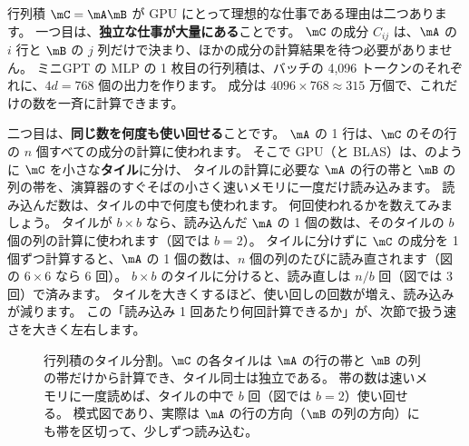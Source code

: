 行列積 $\mC=\mA\mB$ が GPU にとって理想的な仕事である理由は二つあります。
一つ目は、\textbf{独立な仕事が大量にある}ことです。
$\mC$ の成分 $C_{ij}$ は、$\mA$ の $i$ 行と $\mB$ の $j$ 列だけで決まり、ほかの成分の計算結果を待つ必要がありません。
ミニGPT の MLP の 1 枚目の行列積は、バッチの 4,096 トークンのそれぞれに、$4d=768$ 個の出力を作ります。
成分は $4096\times768\approx315$ 万個で、これだけの数を一斉に計算できます。

二つ目は、\textbf{同じ数を何度も使い回せる}ことです。
$\mA$ の 1 行は、$\mC$ のその行の $n$ 個すべての成分の計算に使われます。
そこで GPU（と BLAS）は、のように $\mC$ を小さな\textbf{タイル}に分け、
タイルの計算に必要な $\mA$ の行の帯と $\mB$ の列の帯を、演算器のすぐそばの小さく速いメモリに一度だけ読み込みます。
読み込んだ数は、タイルの中で何度も使われます。
何回使われるかを数えてみましょう。
タイルが $b\times b$ なら、読み込んだ $\mA$ の 1 個の数は、そのタイルの $b$ 個の列の計算に使われます（図では $b=2$）。
タイルに分けずに $\mC$ の成分を 1 個ずつ計算すると、$\mA$ の 1 個の数は、$n$ 個の列のたびに読み直されます（図の $6\times6$ なら 6 回）。
$b\times b$ のタイルに分けると、読み直しは $n/b$ 回（図では 3 回）で済みます。
タイルを大きくするほど、使い回しの回数が増え、読み込みが減ります。
この「読み込み 1 回あたり何回計算できるか」が、次節で扱う速さを大きく左右します。

\begin{figure}[!tbp]
\centering
{}
\caption{行列積のタイル分割。$\mC$ の各タイルは $\mA$ の行の帯と $\mB$ の列の帯だけから計算でき、タイル同士は独立である。
帯の数は速いメモリに一度読めば、タイルの中で $b$ 回（図では $b=2$）使い回せる。
模式図であり、実際は $\mA$ の行の方向（$\mB$ の列の方向）にも帯を区切って、少しずつ読み込む。}
\label{fig:gpu-tiling}
\end{figure}

